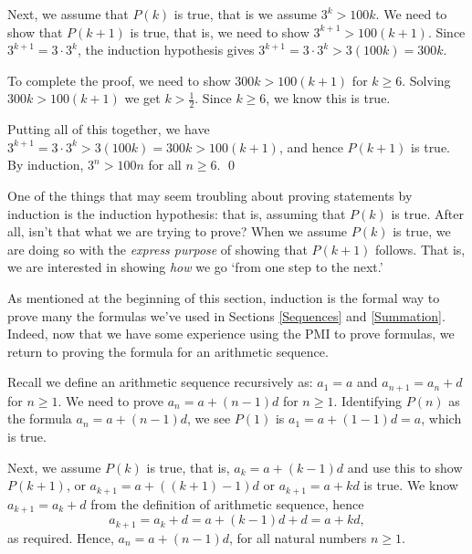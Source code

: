 \documentclass{ximera}
\begin{document}
\begin{example}
\begin{enumerate}
\smallskip

Next, we assume that $P(k)$ is true, that is we assume $3^{k} > 100k$.  We need to show that $P(k+1)$ is true, that is, we need to show $3^{k+1} > 100(k+1)$.  Since $3^{k+1} = 3 \cdot 3^{k}$, the induction hypothesis gives $3^{k+1} = 3 \cdot 3^{k} > 3(100k) = 300k$.  

\smallskip

To complete the proof, we need to show $300k > 100(k+1)$ for $k \geq 6$. Solving $300k > 100(k+1)$ we get $k > \frac{1}{2}$.  Since $k \geq 6$, we know this is true.  

\smallskip

Putting all of this together, we have $3^{k+1} = 3 \cdot 3^{k} > 3(100k) = 300k > 100(k+1)$, and hence $P(k+1)$ is true.  By induction, $3^{n} > 100n$ for all $n \geq 6$.  \qed

\end{enumerate}

\end{example}

One of the things that may seem troubling about proving statements by induction is the induction hypothesis:  that is, assuming that $P(k)$ is true.  After all, isn't that what we are trying to prove?   When we assume $P(k)$ is true, we are doing so with the \textit{express purpose} of showing that $P(k+1)$ follows. That is, we are interested in showing \textit{how} we go `from one step to the next.'  

\smallskip

As mentioned at the beginning of this section, induction is the formal way to prove many the formulas we've used in Sections \ref{Sequences} and \ref{Summation}.  Indeed, now that we have some experience using the PMI to prove formulas, we return to proving the formula for an arithmetic sequence.

\smallskip

Recall we define an arithmetic sequence recursively as:  $a_{1} = a$ and $a_{n+1} = a_{n} + d$ for $n \geq 1$.  We need to prove $a_{n} = a + (n-1) d$ for $n \geq 1$.  Identifying $P(n)$ as the formula $a_{n} = a + (n-1)d$, we see $P(1)$ is $a_{1} = a + (1-1) d = a$, which is true.  
\smallskip

Next, we assume $P(k)$ is true, that is, $a_{k} = a + (k-1)d$ and use this to show  $P(k+1)$, or $a_{k+1} = a+((k+1)-1)d$ or $a_{k+1} = a + kd$ is true.  We know $a_{k+1} = a_{k} + d$ from the definition of arithmetic sequence, hence \[ a_{k+1} = a_{k} + d = a + (k-1)d + d= a + kd,\]
as required.  Hence, $a_{n} = a + (n-1)d$, for all natural numbers $n \geq 1$.
\end{document}
